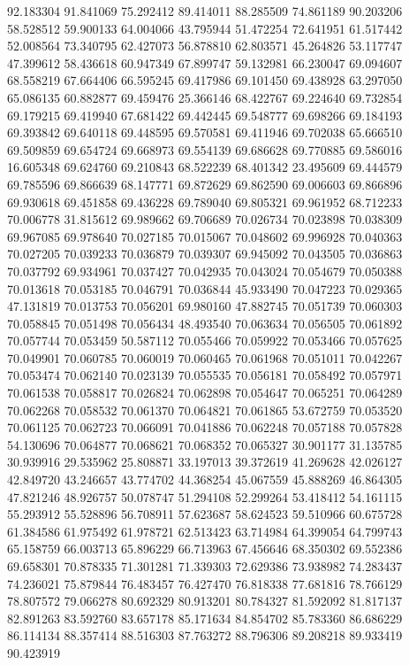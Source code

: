 92.183304
91.841069
75.292412
89.414011
88.285509
74.861189
90.203206
58.528512
59.900133
64.004066
43.795944
51.472254
72.641951
61.517442
52.008564
73.340795
62.427073
56.878810
62.803571
45.264826
53.117747
47.399612
58.436618
60.947349
67.899747
59.132981
66.230047
69.094607
68.558219
67.664406
66.595245
69.417986
69.101450
69.438928
63.297050
65.086135
60.882877
69.459476
25.366146
68.422767
69.224640
69.732854
69.179215
69.419940
67.681422
69.442445
69.548777
69.698266
69.184193
69.393842
69.640118
69.448595
69.570581
69.411946
69.702038
65.666510
69.509859
69.654724
69.668973
69.554139
69.686628
69.770885
69.586016
16.605348
69.624760
69.210843
68.522239
68.401342
23.495609
69.444579
69.785596
69.866639
68.147771
69.872629
69.862590
69.006603
69.866896
69.930618
69.451858
69.436228
69.789040
69.805321
69.961952
68.712233
70.006778
31.815612
69.989662
69.706689
70.026734
70.023898
70.038309
69.967085
69.978640
70.027185
70.015067
70.048602
69.996928
70.040363
70.027205
70.039233
70.036879
70.039307
69.945092
70.043505
70.036863
70.037792
69.934961
70.037427
70.042935
70.043024
70.054679
70.050388
70.013618
70.053185
70.046791
70.036844
45.933490
70.047223
70.029365
47.131819
70.013753
70.056201
69.980160
47.882745
70.051739
70.060303
70.058845
70.051498
70.056434
48.493540
70.063634
70.056505
70.061892
70.057744
70.053459
50.587112
70.055466
70.059922
70.053466
70.057625
70.049901
70.060785
70.060019
70.060465
70.061968
70.051011
70.042267
70.053474
70.062140
70.023139
70.055535
70.056181
70.058492
70.057971
70.061538
70.058817
70.026824
70.062898
70.054647
70.065251
70.064289
70.062268
70.058532
70.061370
70.064821
70.061865
53.672759
70.053520
70.061125
70.062723
70.066091
70.041886
70.062248
70.057188
70.057828
54.130696
70.064877
70.068621
70.068352
70.065327
30.901177
31.135785
30.939916
29.535962
25.808871
33.197013
39.372619
41.269628
42.026127
42.849720
43.246657
43.774702
44.368254
45.067559
45.888269
46.864305
47.821246
48.926757
50.078747
51.294108
52.299264
53.418412
54.161115
55.293912
55.528896
56.708911
57.623687
58.624523
59.510966
60.675728
61.384586
61.975492
61.978721
62.513423
63.714984
64.399054
64.799743
65.158759
66.003713
65.896229
66.713963
67.456646
68.350302
69.552386
69.658301
70.878335
71.301281
71.339303
72.629386
73.938982
74.283437
74.236021
75.879844
76.483457
76.427470
76.818338
77.681816
78.766129
78.807572
79.066278
80.692329
80.913201
80.784327
81.592092
81.817137
82.891263
83.592760
83.657178
85.171634
84.854702
85.783360
86.686229
86.114134
88.357414
88.516303
87.763272
88.796306
89.208218
89.933419
90.423919
